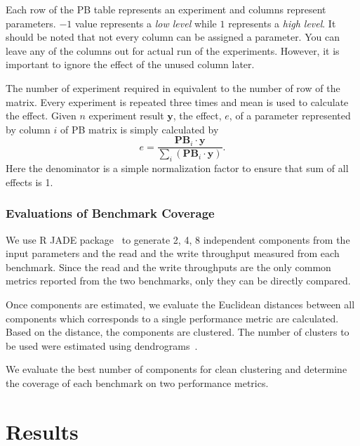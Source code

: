 Each row of the PB table represents an experiment and columns represent parameters. 
$-1$ value represents a \emph{low level} while $1$ represents a \emph{high level}. 
It should be noted that not every column can be assigned a parameter. 
You can leave any of the columns out for actual run of the experiments. 
However, it is important to ignore the effect of the unused column later. 

The number of experiment required in equivalent to the number of row of the matrix. 
Every experiment is repeated three times and mean is used to calculate the effect. 
Given $n$ experiment result $\mathbf{y}$, the effect, $e$, of a parameter represented by column $i$ of PB matrix is simply calculated by
\begin{equation}
e=\frac{\mathbf{PB}_i \cdot \mathbf{y}}{\sum \limits_i (\mathbf{PB}_i \cdot \mathbf{y})}.
\end{equation}
Here the denominator is a simple normalization factor to ensure that sum of all effects is 1. 

\subsubsection{Evaluations of Benchmark Coverage}

We use R JADE package~\cite{ilmonen:2010} to generate 2, 4, 8 independent components from the input parameters and the read and the write throughput measured from each benchmark. 
Since the read and the write throughputs are the only common metrics reported from the two benchmarks, only they can be directly compared. 

Once components are estimated, we evaluate the Euclidean distances between all components which corresponds to a single performance metric are calculated. 
Based on the distance, the components are clustered. 
The number of clusters to be used were estimated using dendrograms~\cite{szekely:2005}. 

We evaluate the best number of components for clean clustering and determine the coverage of each benchmark on two performance metrics.  

\section{Results}

